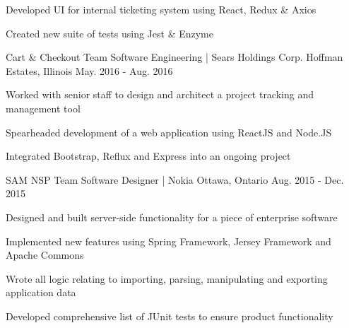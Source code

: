 \begin{cventries}
{\begin{cvitems}
        \item {Developed UI for internal ticketing system using React, Redux \& Axios}
        \item {Created new suite of tests using Jest \& Enzyme}
      \end{cvitems}
    }
    \cventry
    {Cart \& Checkout Team}
    {Software Engineering | Sears Holdings Corp.}
    {Hoffman Estates, Illinois}
    {May. 2016 - Aug. 2016}
    {
      \begin{cvitems}
        \item {Worked with senior staff to design and architect a project tracking and management tool}
       \item {Spearheaded development of a web application using ReactJS and Node.JS}
        \item {Integrated Bootstrap, Reflux and Express into an ongoing project}
      \end{cvitems}
    }
  \cventry
    {SAM NSP Team}
    {Software Designer | Nokia}
    {Ottawa, Ontario}
    {Aug. 2015 - Dec. 2015}
    {
      \begin{cvitems}
        \item {Designed and built server-side functionality for a piece of enterprise software}
        \item {Implemented new features using Spring Framework, Jersey Framework and Apache Commons}
        \item {Wrote all logic relating to importing, parsing, manipulating and exporting application data}
        \item {Developed comprehensive list of JUnit tests to ensure product functionality}
      \end{cvitems}
    }
\end{cventries}
